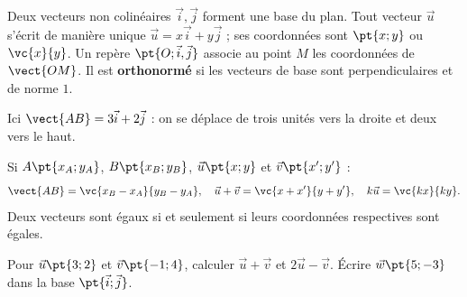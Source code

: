 \begin{keypoint}[Définitions]
Deux vecteurs non colinéaires $\vec i,\vec j$ forment une base du plan. Tout vecteur $\vec u$ s'écrit de manière unique $\vec u=x\vec i+y\vec j$ ; ses coordonnées sont $\pt{x;y}$ ou $\vc{x}{y}$.
Un repère $\pt{O;\vec i,\vec j}$ associe au point $M$ les coordonnées de $\vect{OM}$. Il est \textbf{orthonormé} si les vecteurs de base sont perpendiculaires et de norme $1$.
\end{keypoint}
\begin{center}\end{center}
Ici $\vect{AB}=3\vec i+2\vec j$ : on se déplace de trois unités vers la droite et deux vers le haut.
\begin{keypoint}
Si $A\pt{x_A;y_A}$, $B\pt{x_B;y_B}$, $\vec u\pt{x;y}$ et $\vec v\pt{x';y'}$ :
\[\vect{AB}=\vc{x_B-x_A}{y_B-y_A},\quad \vec u+\vec v=\vc{x+x'}{y+y'},\quad k\vec u=\vc{kx}{ky}.\]
Deux vecteurs sont égaux si et seulement si leurs coordonnées respectives sont égales.
\end{keypoint}
\begin{example}Pour $\vec u\pt{3;2}$ et $\vec v\pt{-1;4}$, calculer $\vec u+\vec v$ et $2\vec u-\vec v$. Écrire $\vec w\pt{5;-3}$ dans la base $\pt{\vec i;\vec j}$.\end{example}

